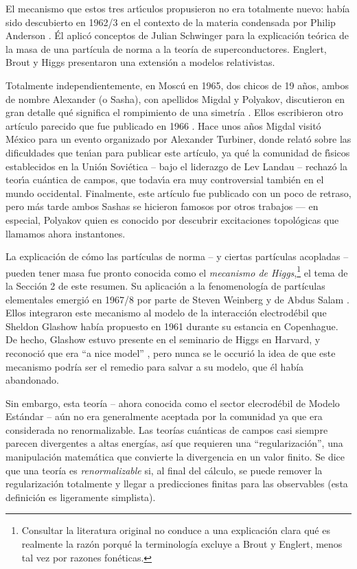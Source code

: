 \documentclass[12pt]{article}
\begin{document}
El mecanismo que estos tres art\'{\i}culos propusieron no era
totalmente nuevo: había sido descubierto en 1962/3 en el contexto de la
materia condensada por Philip Anderson \cite{Anderson}. \'El aplic\'o
conceptos de Julian Schwinger \cite{Schwinger} para la explicaci\'on
teórica de la masa de una part\'icula de norma a la teor\'ia de
superconductores. Englert, Brout y Higgs presentaron una
extensi\'on a modelos relativistas.

Totalmente independientemente, en Mosc\'{u} en 1965, dos chicos de 19
a\~nos, ambos de nombre Alexander (o Sasha), con apellidos Migdal y
Polyakov, discutieron en gran detalle qu\'e significa el rompimiento
de una simetr\'ia \cite{Nobel13}. Ellos escribieron otro art\'iculo
parecido que fue publicado en 1966 \cite{MigPol}. Hace unos
a\~{n}os Migdal
visit\'o M\'exico para un evento organizado por Alexander Turbiner,
donde relat\'o sobre las dificuldades que ten\'{\i}an para publicar
este art\'iculo, ya qu\'e la comunidad de f\'{\i}sicos establecidos
en la Uni\'on Sovi\'etica -- bajo el liderazgo de Lev Landau -- rechaz\'o
la teor\'{\i}a cu\'antica de campos, que todav\'{\i}a era muy
controversial tambi\'en en el mundo occidental. Finalmente, este art\'iculo fue publicado con un poco de retraso, pero m\'as tarde ambos Sashas se hicieron
famosos por otros trabajos --- en especial, Polyakov  quien es conocido por
descubrir excitaciones topol\'ogicas que llamamos ahora instantones.

La explicaci\'on de cómo  las part\'iculas de norma -- y ciertas part\'iculas
acopladas -- pueden tener masa fue pronto conocida como el {\em mecanismo
de Higgs},\footnote{Consultar la literatura original no conduce a
  una explicaci\'on clara qu\'e es realmente la raz\'on porqu\'e la
  terminolog\'ia excluye a Brout y Englert, menos tal vez por razones
  fon\'eticas.} el tema de la Secci\'on 2 de este resumen.
Su aplicaci\'on a la fenomenolog\'ia de part\'iculas elementales 
emergi\'o en 1967/8 por parte de Steven Weinberg \cite{Weinberg} y
de Abdus Salam \cite{Salam}.
Ellos integraron este mecanismo al modelo de la interacci\'on
electrod\'ebil que Sheldon Glashow hab\'ia propuesto en 1961
\cite{Glashow} durante su estancia en Copenhague.
De hecho, Glashow estuvo presente en el seminario de Higgs en Harvard,
y reconoci\'o que era ``a nice model'' \cite{boson}, pero nunca se le
occuri\'o la idea de que este mecanismo podr\'ia ser el remedio
para salvar a su modelo, que \'el hab\'ia abandonado.

Sin embargo, esta teor\'ia -- ahora conocida como el sector
elecrod\'ebil de Modelo Estándar -- aún no era generalmente aceptada
por la comunidad ya que era considerada no renormalizable.
Las teor\'ias cu\'anticas de campos casi siempre parecen divergentes
a altas energ\'ias, as\'i que requieren una ``regularizaci\'on'',
una manipulaci\'on matem\'atica que convierte la divergencia
en un valor finito. Se dice que una teor\'ia es {\em renormalizable}
si, al final del c\'alculo, se puede remover la regularizaci\'on
totalmente y llegar a predicciones finitas para las observables
(esta definici\'on es ligeramente simplista).
\end{document}
